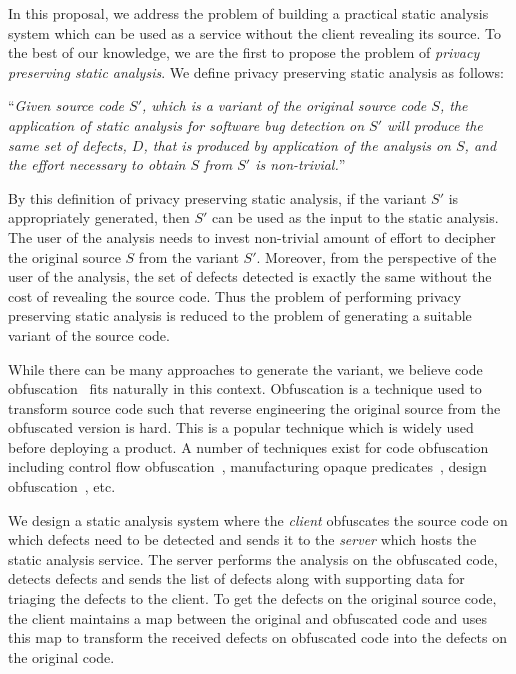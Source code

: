 \documentclass[twocolumn]{article}
\begin{document}
In this proposal, we address the problem of building a practical static analysis system 
which can be used as a service without the client revealing its source. To the best 
of our knowledge, we are the first to propose the problem of {\em privacy preserving 
static analysis}. We define privacy preserving static analysis as follows:  

``{\em Given source code $S'$, which is a variant of the original source code $S$, the application of static 
analysis for software bug detection on $S'$ will produce the same set of defects, $D$, 
that is produced by application of the analysis on $S$, and the effort necessary to obtain 
$S$ from $S'$ is non-trivial.}'' 

By this definition of privacy preserving static analysis, if the variant $S'$ is appropriately generated, 
then $S'$ can be used as the input to the static analysis. The user of the analysis needs to 
invest non-trivial amount of effort to decipher the original source $S$ from the variant $S'$. Moreover, 
from the perspective of the user of the analysis, the set of defects detected is exactly the same without 
the cost of revealing the source code. Thus the problem of performing privacy preserving static analysis 
is reduced to the problem of generating a suitable variant of the source code. 

While there can be many approaches to generate the variant, we believe code obfuscation~\cite{collberg} 
fits naturally in this context. Obfuscation is a technique used to transform source code such that
reverse engineering the original source from the obfuscated version is hard. This is a popular 
technique which is widely used~\cite{zelix,jbco,proguard} before deploying a product. A number of 
techniques exist for code obfuscation including control flow obfuscation~\cite{controlflowobf}, 
manufacturing opaque predicates~\cite{collberg}, design obfuscation~\cite{designobf}, etc. 

We design a static analysis system where the {\em client} obfuscates the source code on which defects 
need to be detected and sends it to the {\em server} which hosts the static analysis service. The server 
performs the analysis on the obfuscated code, detects defects and sends the list of 
defects along with supporting data for triaging the defects to the client. To get the defects on the original source code, 
the client maintains a map between the original and obfuscated code and uses this map to transform 
the received defects on obfuscated code into the defects on the original code. 
\end{document}
